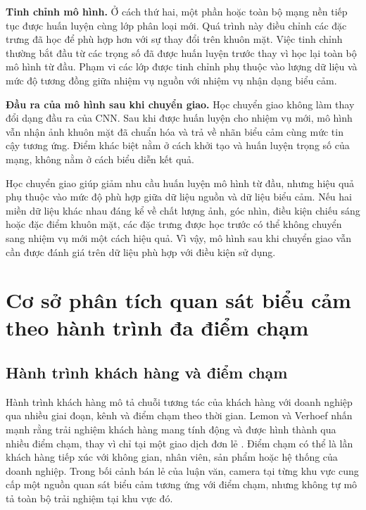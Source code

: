 \documentclass[../LuanVan.tex]{subfiles}
\begin{document}
\noindent\textbf{Tinh chỉnh mô hình.} Ở cách thứ hai, một phần hoặc toàn bộ mạng nền tiếp tục được huấn luyện cùng lớp phân loại mới. Quá trình này điều chỉnh các đặc trưng đã học để phù hợp hơn với sự thay đổi trên khuôn mặt. Việc tinh chỉnh thường bắt đầu từ các trọng số đã được huấn luyện trước thay vì học lại toàn bộ mô hình từ đầu. Phạm vi các lớp được tinh chỉnh phụ thuộc vào lượng dữ liệu và mức độ tương đồng giữa nhiệm vụ nguồn với nhiệm vụ nhận dạng biểu cảm.

\noindent\textbf{Đầu ra của mô hình sau khi chuyển giao.} Học chuyển giao không làm thay đổi dạng đầu ra của CNN. Sau khi được huấn luyện cho nhiệm vụ mới, mô hình vẫn nhận ảnh khuôn mặt đã chuẩn hóa và trả về nhãn biểu cảm cùng mức tin cậy tương ứng. Điểm khác biệt nằm ở cách khởi tạo và huấn luyện trọng số của mạng, không nằm ở cách biểu diễn kết quả.

Học chuyển giao giúp giảm nhu cầu huấn luyện mô hình từ đầu, nhưng hiệu quả phụ thuộc vào mức độ phù hợp giữa dữ liệu nguồn và dữ liệu biểu cảm. Nếu hai miền dữ liệu khác nhau đáng kể về chất lượng ảnh, góc nhìn, điều kiện chiếu sáng hoặc đặc điểm khuôn mặt, các đặc trưng được học trước có thể không chuyển sang nhiệm vụ mới một cách hiệu quả. Vì vậy, mô hình sau khi chuyển giao vẫn cần được đánh giá trên dữ liệu phù hợp với điều kiện sử dụng.

\section{Cơ sở phân tích quan sát biểu cảm theo hành trình đa điểm chạm}
\label{section:2.4}

\subsection{Hành trình khách hàng và điểm chạm}
\label{subsection:2.4.1}

Hành trình khách hàng mô tả chuỗi tương tác của khách hàng với doanh nghiệp qua nhiều giai đoạn, kênh và điểm chạm theo thời gian. Lemon và Verhoef nhấn mạnh rằng trải nghiệm khách hàng mang tính động và được hình thành qua nhiều điểm chạm, thay vì chỉ tại một giao dịch đơn lẻ \cite{lemon2016customerjourney}. Điểm chạm có thể là lần khách hàng tiếp xúc với không gian, nhân viên, sản phẩm hoặc hệ thống của doanh nghiệp. Trong bối cảnh bán lẻ của luận văn, camera tại từng khu vực cung cấp một nguồn quan sát biểu cảm tương ứng với điểm chạm, nhưng không tự mô tả toàn bộ trải nghiệm tại khu vực đó.
\end{document}
